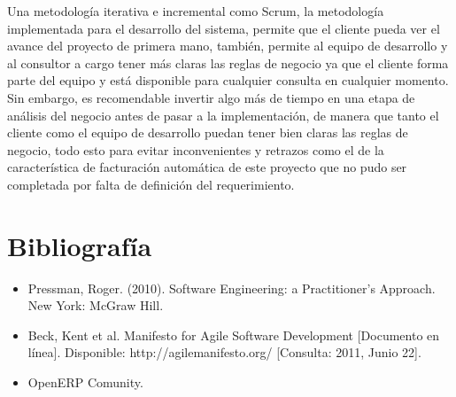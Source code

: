 \documentclass[a4paper, 12pt]{article}
\begin{document}
Una metodología iterativa e incremental como Scrum, la metodología implementada para el desarrollo del sistema, permite que el cliente pueda ver el avance del proyecto de primera mano, también, permite al equipo de desarrollo y al consultor a cargo tener más claras las reglas de negocio ya que el cliente forma parte del equipo y está disponible para cualquier consulta en cualquier momento. Sin embargo, es recomendable invertir algo más de tiempo en una etapa de análisis del negocio antes de pasar a la implementación, de manera que tanto el cliente como el equipo de desarrollo puedan tener bien claras las reglas de negocio, todo esto para evitar inconvenientes y retrazos como el de la característica de facturación automática de este proyecto que no pudo ser completada por falta de definición del requerimiento.

\newpage
\section{Bibliografía}
\begin{itemize}
    \item Pressman, Roger. (2010). Software Engineering: a Practitioner's Approach. New York: McGraw Hill.
    \item Beck, Kent et al. Manifesto for Agile Software Development [Documento en línea]. Disponible: http://agilemanifesto.org/ [Consulta: 2011, Junio 22].
    \item OpenERP Comunity. 
\end{itemize}
\end{document}

